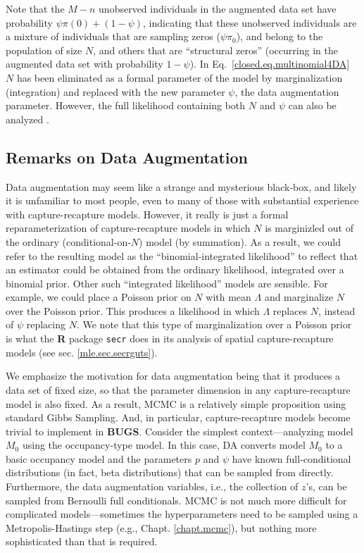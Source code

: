 Note that the $M-n$ unobserved individuals in the augmented data set
have probability $\psi \pi(0) + (1-\psi)$, indicating that these
unobserved individuals are a mixture of individuals that are sampling
zeros ($\psi \pi_0$), and belong to the population of size $N$, and
others that are ``structural zeros'' (occurring in the augmented data
set with probability $1 - \psi$). In Eq.~\ref{closed.eq.multinomial4DA} $N$
has been eliminated as a formal parameter of the model by
marginalization (integration) and replaced with the new parameter
$\psi$, the data augmentation parameter.
However, the full likelihood containing both $N$ and $\psi$ can also be
analyzed \citep[see][]{royle_etal:2007}.


\subsection{Remarks on Data Augmentation}
\label{closed.sec.remarks}

Data augmentation may seem like a strange and mysterious black-box,
and likely it is unfamiliar to most people, even to many of those with substantial
experience with capture-recapture models. However, it really is just a
formal reparameterization of capture-recapture models in which $N$ is
marginizled out of the ordinary (conditional-on-$N$) model (by summation).
As a result, we could refer to the resulting model as the 
``binomial-integrated likelihood'' to reflect that an estimator could
be obtained from the ordinary likelihood, integrated over a binomial
prior. Other such ``integrated likelihood'' models are sensible. For
example, we could place a Poisson prior on $N$ with mean $\Lambda$ and
marginalize $N$ over the Poisson prior. This produces a likelihood in
which $\Lambda$ replaces $N$, instead of $\psi$ replacing $N$.  We
note that this type of marginalization over a Poisson prior is what
the {\bf R} package \mbox{\tt secr} does in its analysis of spatial
capture-recapture models (see sec. \ref{mle.sec.secrguts}).


We emphasize the motivation for data augmentation being that it
produces a data set of fixed size, so that the parameter dimension in
any capture-recapture model is also fixed.  As a result, MCMC is a
relatively simple proposition using standard Gibbs Sampling.  And, in
particular, capture-recapture models become trivial to implement in
{\bf BUGS}. Consider
the simplest context---analyzing model $M_0$ using the occupancy-type
model. In this case, DA converts model $M_0$ to a basic occupancy model
and the parameters $p$ and $\psi$ have known full-conditional
distributions (in fact, beta distributions) that can be sampled from
directly.  Furthermore, the data augmentation variables, i.e., the collection
of $z$'s, can be sampled from Bernoulli full
conditionals. MCMC is not much more difficult for complicated
models---sometimes the hyperparameters need to be sampled using a
Metropolis-Hastings step (e.g., Chapt. \ref{chapt.mcmc}), but nothing more sophisticated than that is
required.

